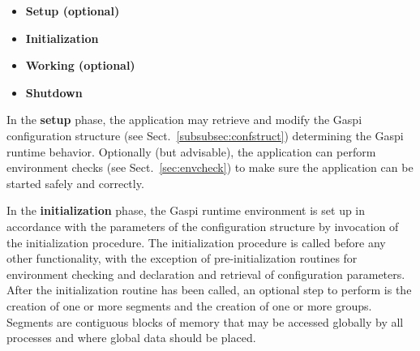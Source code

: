 \documentclass[a4paper]{article}
\newlength{\st}\setlength{\st}{0pt}
\newcommand{\GASPI}{{\sc Gaspi}}
\begin{document}
\begin{itemize}
\item \textbf{Setup (optional)}
\item \textbf{Initialization}
\item \textbf{Working (optional)}
\item \textbf{Shutdown}
\end{itemize}


In the \textbf{setup} phase, the application may retrieve and modify
the \GASPI{} configuration structure (see Sect.~\ref{subsubsec:confstruct})
determining the \GASPI{} runtime behavior. Optionally (but
advisable), the application can perform environment checks (see
Sect.~\ref{sec:envcheck}) to make sure the application can be
started safely and correctly.

In the \textbf{initialization} phase, the \GASPI{} runtime environment
is set up in accordance with the parameters of the configuration
structure by invocation of the initialization procedure.  The
initialization procedure is called before any other functionality,
with the exception of pre-initialization routines for environment
checking and declaration and retrieval of configuration parameters.
After the initialization routine has been called, an optional step to
perform is the creation of one or more segments and the creation of
one or more groups.  Segments are contiguous blocks of memory that may
be accessed globally by all processes and where global data should be
placed.
\end{document}
